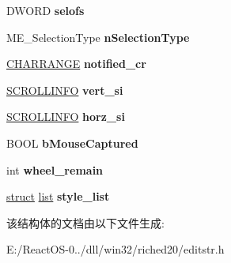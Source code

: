 \begin{DoxyCompactItemize}
D\+W\+O\+RD {\bfseries selofs}
\item 
\mbox{\label{structtag_m_e___text_editor_a91a92eb5a35ebcaa364bc19db5876b8e}} 
M\+E\+\_\+\+Selection\+Type {\bfseries n\+Selection\+Type}
\item 
\mbox{\label{structtag_m_e___text_editor_ad12d5f9d854db8757751da1550811085}} 
\hyperlink{struct__charrange}{C\+H\+A\+R\+R\+A\+N\+GE} {\bfseries notified\+\_\+cr}
\item 
\mbox{\label{structtag_m_e___text_editor_a44117434bb56a69ffc8c6e1b16bb9585}} 
\hyperlink{structtag_s_c_r_o_l_l_i_n_f_o}{S\+C\+R\+O\+L\+L\+I\+N\+FO} {\bfseries vert\+\_\+si}
\item 
\mbox{\label{structtag_m_e___text_editor_aa76b38dc8eb534b8c83c49f9f6587ea4}} 
\hyperlink{structtag_s_c_r_o_l_l_i_n_f_o}{S\+C\+R\+O\+L\+L\+I\+N\+FO} {\bfseries horz\+\_\+si}
\item 
\mbox{\label{structtag_m_e___text_editor_ae8902458d79137c9fc0cd34daf15fefa}} 
B\+O\+OL {\bfseries b\+Mouse\+Captured}
\item 
\mbox{\label{structtag_m_e___text_editor_a2a218181ff0a47e5bac5e68ec10938ec}} 
int {\bfseries wheel\+\_\+remain}
\item 
\mbox{\label{structtag_m_e___text_editor_adc215bb2647d8946b2ef3c948614d09a}} 
\hyperlink{interfacestruct}{struct} \hyperlink{classlist}{list} {\bfseries style\+\_\+list}
\end{DoxyCompactItemize}


该结构体的文档由以下文件生成\+:\begin{DoxyCompactItemize}
\item 
E\+:/\+React\+O\+S-\/0../dll/win32/riched20/editstr.\+h\end{DoxyCompactItemize}
